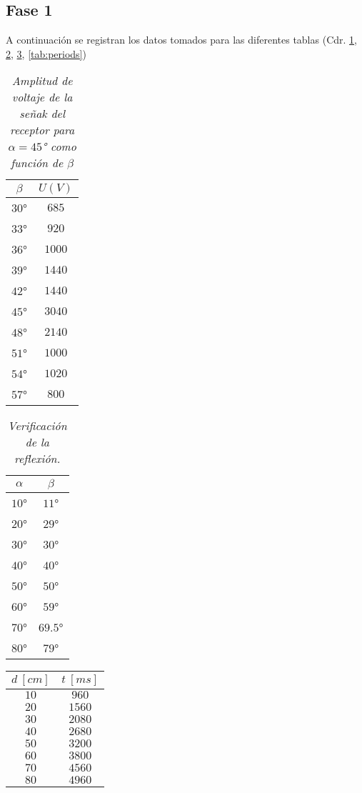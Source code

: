 \documentclass[spanish,notitlepage,letterpaper, 12pt]{article}
\begin{document}
\subsection{Fase 1}
A continuación se registran los datos tomados para las diferentes tablas (Cdr. \ref{tab:b-angle}, \ref{tab:a-n-b}, \ref{tab:d-n-t}, \ref{tab:periods})
\begin{table}[!ht]
    \centering
    \begin{tabular}{|c|c|}
        \hline
        $\beta$ & $U(V)$ \\
        \hline\hline
        $30$° & $685$ \\
        $33$° & $920$ \\
        $36$° & $1000$ \\
        $39$° & $1440$ \\
        $42$° & $1440$ \\
        $45$° & $3040$ \\
        $48$° & $2140$ \\
        $51$° & $1000$ \\
        $54$° & $1020$ \\
        $57$° & $800$ \\
        \hline
    \end{tabular}
    \label{tab:b-angle}
    \caption{\textit{Amplitud de voltaje de la señak del receptor para $\alpha=45$° como función de $\beta$}}
\end{table}
\begin{table}[!ht]
    \centering
    \begin{tabular}{|c|c|}
        \hline
        $\alpha$ & $\beta$ \\
        \hline\hline
        $10$° & $11$°\\
        $20$° & $29$°\\
        $30$° & $30$°\\
        $40$° & $40$°\\
        $50$° & $50$°\\
        $60$° & $59$°\\
        $70$° & $69.5$°\\
        $80$° & $79$°\\
        \hline
    \end{tabular}
    \label{tab:a-n-b}
    \caption{\textit{Verificación de la reflexión.}}
\end{table}
\begin{table}[!ht]
    \centering
    \begin{tabular}{|c|c|}
        \hline
        $d\ [cm]$ & $t\ [ms]$\\
        \hline\hline
        $10$ & $960$\\
        $20$ & $1560$\\
        $30$ & $2080$\\
        $40$ & $2680$\\
        $50$ & $3200$\\
        $60$ & $3800$\\
        $70$ & $4560$\\
        $80$ & $4960$\\
        \hline
    \end{tabular}
    \label{tab:d-n-t}
\end{table}
\end{document}
